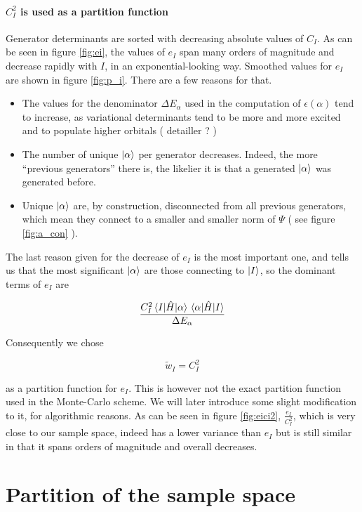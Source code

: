\documentclass[./thesis.tex]{subfiles}
\begin{document}
\paragraph{$C_I^2$ is used as a partition function}
Generator determinants are sorted with decreasing absolute values of $C_I$.
	As can be seen in figure \ref{fig:ei}, the values of $e_I$ span many orders of magnitude and decrease rapidly with $I$, in an exponential-looking way. Smoothed values for $e_I$ are shown in figure \ref{fig:p_i}. There are a few reasons for that.
\begin{itemize}
	\item
	The values for the denominator $\Delta E_\alpha$ used in the computation of $\epsilon(\alpha)$ tend to increase, as variational determinants tend to be more and more excited and to populate higher orbitals ( detailler ? )
	\item
	The number of unique $\ket \alpha$ per generator decreases. Indeed, the more ``previous generators'' there is, the likelier it is that a generated $\ket \alpha$ was generated before.
	\item
	Unique $\ket \alpha$ are, by construction, disconnected from all previous generators, which mean they connect to a smaller and smaller norm of $\Psi$ ( see figure \ref{fig:a_con} ). 
\end{itemize}


The last reason given for the decrease of $e_I$ is the most important one, and tells us that the most significant $\ket \alpha$ are those connecting to ${\ket{I}}$, so the dominant terms of $e_I$ are 

\begin{equation}
\frac{C_I^2 \mel{I}{\hat{H}}{\alpha}\mel{\alpha}{\hat{H}}{I}}{\Delta E_{\alpha}}
\end{equation}

Consequently we chose

\begin{equation}
\tilde w_I = C_I^2
\end{equation}

as a partition function for $e_I$. This is however not the exact partition function used in the Monte-Carlo scheme. We will later introduce some slight modification to it, for algorithmic reasons.
As can be seen in figure \ref{fig:eici2}, $\frac{e_I}{C_I^2}$, which is very close to our sample space, indeed has a lower variance than $e_I$ but is still similar in that it spans orders of magnitude and overall decreases.

\section{Partition of the sample space}
\end{document}
